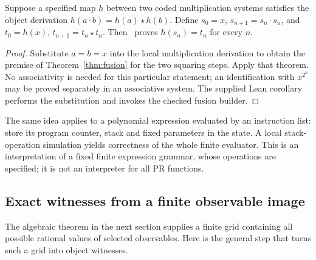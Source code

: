 \begin{corollary}
\label{cor:squaring}
Suppose a specified map $h$ between two coded multiplication systems
satisfies the object derivation
$h(a\cdot b)=h(a)\star h(b)$.
Define $s_0=x$, $s_{n+1}=s_n\cdot s_n$, and
$t_0=h(x)$, $t_{n+1}=t_n\star t_n$. Then \ipra\ proves
$h(s_n)=t_n$ for every $n$.
\end{corollary}
\begin{proof}
Substitute $a=b=x$ into the local multiplication derivation to obtain
the premise of Theorem~\ref{thm:fusion} for the two squaring steps.
Apply that theorem. No associativity is needed for this particular
statement; an identification with $x^{2^n}$ may be proved separately
in an associative system. The supplied Lean corollary performs the
substitution and invokes the checked fusion builder.
\end{proof}

The same idea applies to a polynomial expression evaluated by an
instruction list: store its program counter, stack and fixed parameters
in the state. A local stack-operation simulation yields correctness of
the whole finite evaluator. This is an interpretation of a fixed finite
expression grammar, whose operations are specified; it is not an
interpreter for all PR functions.

\subsection{Exact witnesses from a finite observable image}

The algebraic theorem in the next section supplies a finite grid
containing all possible rational values of selected observables. Here
is the general step that turns such a grid into object witnesses.

